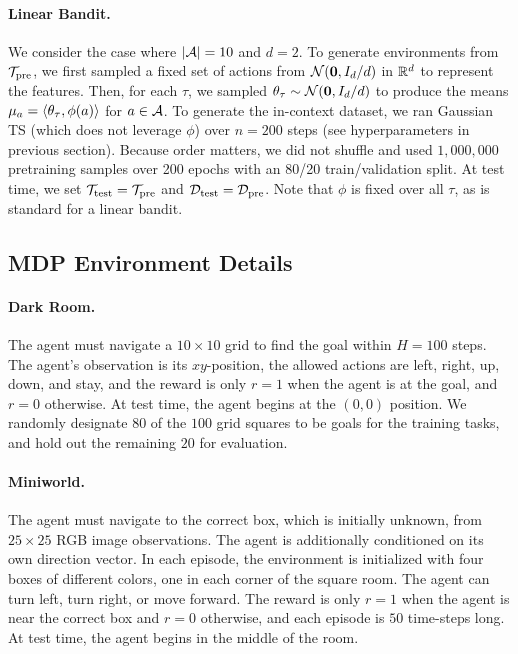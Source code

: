 \paragraph{Linear Bandit.}
We consider the case where $|\mathcal{A}| = 10$ and $d = 2$. To generate environments from ${\mathcal{T}}_{\text{pre}}$, we first sampled a fixed set of actions from $\mathcal{N}({\bf 0}, I_d / d)$ in $\mathbb{R}^d$ to represent the features. Then, for each $\tau$, we sampled $\theta_\tau \sim \mathcal{N}({\bf 0}, I_d / d)$ to produce the means $\mu_a = \langle{\theta_\tau},{\phi(a)}\rangle$ for $a \in \mathcal{A}$. To generate the in-context dataset, we ran Gaussian TS (which does not leverage $\phi$) over $n = 200$ steps (see hyperparameters in previous section). Because order matters, we did not shuffle and used $1,000,000$ pretraining samples over 200 epochs with an 80/20 train/validation split. At test time, we set ${\mathcal{T}}_{\text{test}} = {\mathcal{T}}_{\text{pre}}$ and $\mathcal{D}_{\text{test}} = \mathcal{D}_{\text{pre}}$. Note that $\phi$ is fixed over all $\tau$, as is standard for a linear bandit.


\subsection{MDP Environment Details}
\label{app:environments}

\paragraph{Dark Room.} The agent must navigate a $10 \times 10$ grid to find the goal within $H = 100$ steps. The agent's observation is its $xy$-position, the allowed actions are left, right, up, down, and stay, and the reward is only $r=1$ when the agent is at the goal, and $r=0$ otherwise. At test time, the agent begins at the $(0, 0)$ position. We randomly designate $80$ of the $100$ grid squares to be goals for the training tasks, and hold out the remaining $20$ for evaluation. 

\paragraph{Miniworld.} The agent must navigate to the correct box, which is initially unknown, from $25 \times 25$ RGB image observations. The agent is additionally conditioned on its own direction vector. In each episode, the environment is initialized with four boxes of different colors, one in each corner of the square room. The agent can turn left, turn right, or move forward. The reward is only $r=1$ when the agent is near the correct box and $r=0$ otherwise, and each episode is $50$ time-steps long. At test time, the agent begins in the middle of the room.


